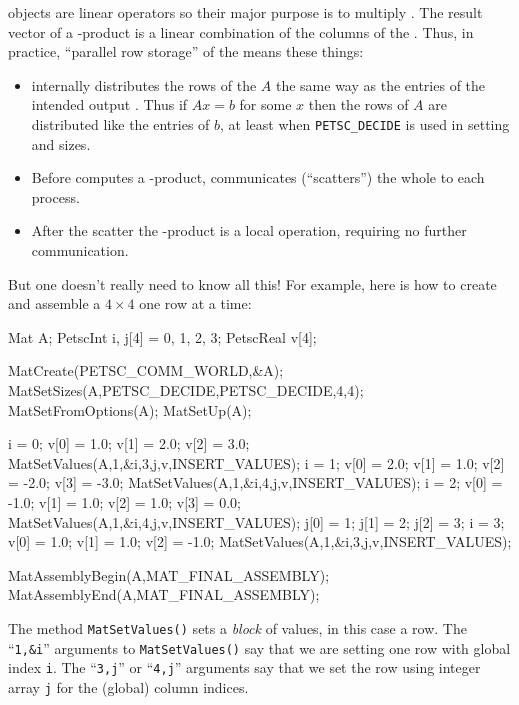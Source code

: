 \pMat objects are linear operators so their major purpose is to multiply \pVecs.  The result vector of a \pMat-\pVec product is a linear combination of the columns of the \pMat.  Thus, in practice, ``parallel row storage'' of the \pMat means these things:\begin{itemize}
\item \PETSc internally distributes the rows of the \pMat $A$ the same way as the entries of the intended output \pVec.  Thus if $Ax=b$ for some $x$ then the rows of $A$ are distributed like the entries of $b$, at least when \texttt{PETSC\_DECIDE} is used in setting \pVec and \pMat sizes.
\item Before \PETSc computes a \pMat-\pVec product, \PETSc communicates (``scatters'') the whole \pVec to each process.
\item After the scatter the \pMat-\pVec product is a local operation, requiring no further communication.
\end{itemize}

But one doesn't really need to know all this!  For example, here is how to create and assemble a $4\times 4$ \pMat one row at a time:
\begin{code}
Mat A;
PetscInt  i, j[4] = {0, 1, 2, 3};
PetscReal v[4];

MatCreate(PETSC_COMM_WORLD,&A);
MatSetSizes(A,PETSC_DECIDE,PETSC_DECIDE,4,4);
MatSetFromOptions(A);
MatSetUp(A);

i = 0;  v[0] = 1.0;  v[1] = 2.0;  v[2] = 3.0;
MatSetValues(A,1,&i,3,j,v,INSERT_VALUES);
i = 1;  v[0] = 2.0;  v[1] = 1.0;  v[2] = -2.0;  v[3] = -3.0;
MatSetValues(A,1,&i,4,j,v,INSERT_VALUES);
i = 2;  v[0] = -1.0;  v[1] = 1.0;  v[2] = 1.0;  v[3] = 0.0;
MatSetValues(A,1,&i,4,j,v,INSERT_VALUES);
j[0] = 1;  j[1] = 2;  j[2] = 3;
i = 3;  v[0] = 1.0;  v[1] = 1.0;  v[2] = -1.0;
MatSetValues(A,1,&i,3,j,v,INSERT_VALUES);

MatAssemblyBegin(A,MAT_FINAL_ASSEMBLY);
MatAssemblyEnd(A,MAT_FINAL_ASSEMBLY);
\end{code}
The method \texttt{MatSetValues()} sets a \emph{block} of values, in this case a row.  The ``\texttt{1,\&i}'' arguments to \texttt{MatSetValues()} say that we are setting one row with global index \texttt{i}.  The ``\texttt{3,j}'' or ``\texttt{4,j}'' arguments say that we set the row using integer array \texttt{j} for the (global) column indices.

